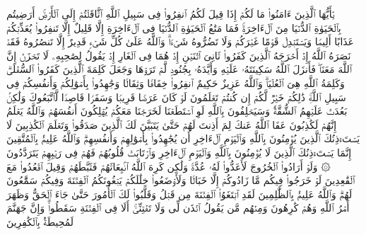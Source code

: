 \stopbuffer%
\startbuffer[\q:9:38]
یَٰۤأَیُّهَا ٱلَّذِینَ ءَامَنُوا۟ مَا لَكُمۡ إِذَا قِیلَ لَكُمُ ٱنفِرُوا۟ فِی سَبِیلِ ٱللَّهِ ٱثَّاقَلۡتُمۡ إِلَى ٱلۡأَرۡضِۚ أَرَضِیتُم بِٱلۡحَیَوٰةِ ٱلدُّنۡیَا مِنَ ٱلۡءَاخِرَةِۚ فَمَا مَتَٰعُ ٱلۡحَیَوٰةِ ٱلدُّنۡیَا فِی ٱلۡءَاخِرَةِ إِلَّا قَلِیلٌ%
\stopbuffer%
\startbuffer[\q:9:39]
إِلَّا تَنفِرُوا۟ یُعَذِّبۡكُمۡ عَذَابًا أَلِیمࣰا وَیَسۡتَبۡدِلۡ قَوۡمًا غَیۡرَكُمۡ وَلَا تَضُرُّوهُ شَیۡءࣰاۗ وَٱللَّهُ عَلَىٰ كُلِّ شَیۡءࣲ قَدِیرٌ%
\stopbuffer%
\startbuffer[\q:9:40]
إِلَّا تَنصُرُوهُ فَقَدۡ نَصَرَهُ ٱللَّهُ إِذۡ أَخۡرَجَهُ ٱلَّذِینَ كَفَرُوا۟ ثَانِیَ ٱثۡنَیۡنِ إِذۡ هُمَا فِی ٱلۡغَارِ إِذۡ یَقُولُ لِصَٰحِبِهِۦ لَا تَحۡزَنۡ إِنَّ ٱللَّهَ مَعَنَاۖ فَأَنزَلَ ٱللَّهُ سَكِینَتَهُۥ عَلَیۡهِ وَأَیَّدَهُۥ بِجُنُودࣲ لَّمۡ تَرَوۡهَا وَجَعَلَ كَلِمَةَ ٱلَّذِینَ كَفَرُوا۟ ٱلسُّفۡلَىٰۗ وَكَلِمَةُ ٱللَّهِ هِیَ ٱلۡعُلۡیَاۗ وَٱللَّهُ عَزِیزٌ حَكِیمٌ%
\stopbuffer%
\startbuffer[\q:9:41]
ٱنفِرُوا۟ خِفَافࣰا وَثِقَالࣰا وَجَٰهِدُوا۟ بِأَمۡوَٰلِكُمۡ وَأَنفُسِكُمۡ فِی سَبِیلِ ٱللَّهِۚ ذَٰلِكُمۡ خَیۡرࣱ لَّكُمۡ إِن كُنتُمۡ تَعۡلَمُونَ%
\stopbuffer%
\startbuffer[\q:9:42]
لَوۡ كَانَ عَرَضࣰا قَرِیبࣰا وَسَفَرࣰا قَاصِدࣰا لَّٱتَّبَعُوكَ وَلَٰكِنۢ بَعُدَتۡ عَلَیۡهِمُ ٱلشُّقَّةُۚ وَسَیَحۡلِفُونَ بِٱللَّهِ لَوِ ٱسۡتَطَعۡنَا لَخَرَجۡنَا مَعَكُمۡ یُهۡلِكُونَ أَنفُسَهُمۡ وَٱللَّهُ یَعۡلَمُ إِنَّهُمۡ لَكَٰذِبُونَ%
\stopbuffer%
\startbuffer[\q:9:43]
عَفَا ٱللَّهُ عَنكَ لِمَ أَذِنتَ لَهُمۡ حَتَّىٰ یَتَبَیَّنَ لَكَ ٱلَّذِینَ صَدَقُوا۟ وَتَعۡلَمَ ٱلۡكَٰذِبِینَ%
\stopbuffer%
\startbuffer[\q:9:44]
لَا یَسۡتَءۡذِنُكَ ٱلَّذِینَ یُؤۡمِنُونَ بِٱللَّهِ وَٱلۡیَوۡمِ ٱلۡءَاخِرِ أَن یُجَٰهِدُوا۟ بِأَمۡوَٰلِهِمۡ وَأَنفُسِهِمۡۗ وَٱللَّهُ عَلِیمُۢ بِٱلۡمُتَّقِینَ%
\stopbuffer%
\startbuffer[\q:9:45]
إِنَّمَا یَسۡتَءۡذِنُكَ ٱلَّذِینَ لَا یُؤۡمِنُونَ بِٱللَّهِ وَٱلۡیَوۡمِ ٱلۡءَاخِرِ وَٱرۡتَابَتۡ قُلُوبُهُمۡ فَهُمۡ فِی رَیۡبِهِمۡ یَتَرَدَّدُونَ%
\stopbuffer%
\startbuffer[\q:9:46]
۞ وَلَوۡ أَرَادُوا۟ ٱلۡخُرُوجَ لَأَعَدُّوا۟ لَهُۥ عُدَّةࣰ وَلَٰكِن كَرِهَ ٱللَّهُ ٱنۢبِعَاثَهُمۡ فَثَبَّطَهُمۡ وَقِیلَ ٱقۡعُدُوا۟ مَعَ ٱلۡقَٰعِدِینَ%
\stopbuffer%
\startbuffer[\q:9:47]
لَوۡ خَرَجُوا۟ فِیكُم مَّا زَادُوكُمۡ إِلَّا خَبَالࣰا وَلَأَوۡضَعُوا۟ خِلَٰلَكُمۡ یَبۡغُونَكُمُ ٱلۡفِتۡنَةَ وَفِیكُمۡ سَمَّٰعُونَ لَهُمۡۗ وَٱللَّهُ عَلِیمُۢ بِٱلظَّٰلِمِینَ%
\stopbuffer%
\startbuffer[\q:9:48]
لَقَدِ ٱبۡتَغَوُا۟ ٱلۡفِتۡنَةَ مِن قَبۡلُ وَقَلَّبُوا۟ لَكَ ٱلۡأُمُورَ حَتَّىٰ جَاۤءَ ٱلۡحَقُّ وَظَهَرَ أَمۡرُ ٱللَّهِ وَهُمۡ كَٰرِهُونَ%
\stopbuffer%
\startbuffer[\q:9:49]
وَمِنۡهُم مَّن یَقُولُ ٱئۡذَن لِّی وَلَا تَفۡتِنِّیۤۚ أَلَا فِی ٱلۡفِتۡنَةِ سَقَطُوا۟ۗ وَإِنَّ جَهَنَّمَ لَمُحِیطَةُۢ بِٱلۡكَٰفِرِینَ%
\stopbuffer%
\startbuffer[\q:9:50]
